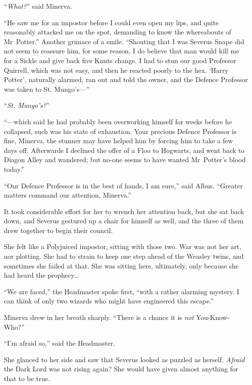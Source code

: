 “\emph{What?}” said Minerva.

“He saw me for an impostor before I could even open my lips, and quite reasonably attacked me on the spot, demanding to know the whereabouts of Mr~Potter.” Another grimace of a smile.
“Shouting that I was Severus Snape did not seem to reassure him, for some reason. I do believe that man would kill me for a Sickle and give back five Knuts change. I had to stun our good Professor Quirrell, which was not easy, and then he reacted poorly to the hex. ‘Harry Potter’, naturally alarmed, ran out and told the owner, and the Defence Professor was taken to St. Mungo’s—”

“\emph{St. Mungo’s?}”

“—which said he had probably been overworking himself for weeks before he collapsed, such was his state of exhaustion. Your precious Defence Professor is fine, Minerva, the stunner may have helped him by forcing him to take a few days off. Afterwards I declined the offer of a Floo to Hogwarts, and went back to Diagon Alley and wandered; but no-one seems to have wanted Mr~Potter’s blood today.”

“Our Defence Professor is in the best of hands, I am sure,” said Albus.
“Greater matters command our attention, Minerva.”

It took considerable effort for her to wrench her attention back, but she sat back down, and Severus gestured up a chair for himself as well, and the three of them drew together to begin their council.

She felt like a Polyjuiced impostor, sitting with those two. War was not her art, nor plotting. She had to strain to keep one step ahead of the Weasley twins, and sometimes she failed at that. She was sitting here, ultimately, only because she had heard the prophecy…

“We are faced,” the Headmaster spoke first, “with a rather alarming mystery. I can think of only two wizards who might have engineered this escape.”

Minerva drew in her breath sharply.
“There is a chance it is \emph{not} You-Know-Who?”

“I’m afraid so,” said the Headmaster.

She glanced to her side and saw that Severus looked as puzzled as herself. \emph{Afraid} the Dark Lord was not rising again? She would have given almost anything for that to be true.

